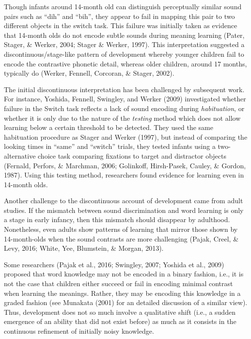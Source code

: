 \documentclass[english,,man,floatsintext]{apa6}
\theoremstyle{definition}
\theoremstyle{definition}
\theoremstyle{definition}
\theoremstyle{remark}
\begin{document}
Though infants around 14-month old can distinguish perceptually similar
sound pairs such as \enquote{dih} and \enquote{bih}, they appear to fail
in mapping this pair to two different objects in the switch task. This
failure was initially taken as evidence that 14-month olds do not encode
subtle sounds during meaning learning (Pater, Stager, \& Werker, 2004;
Stager \& Werker, 1997). This interpretation suggested a
discontinuous/stage-like pattern of development whereby younger children
fail to encode the contrastive phonetic detail, whereas older children,
around 17 months, typically do (Werker, Fennell, Corcoran, \& Stager,
2002).

The initial discontinuous interpretation has been challenged by
subsequent work. For instance, Yoshida, Fennell, Swingley, and Werker
(2009) investigated whether failure in the Switch task reflects a lack
of sound encoding during \emph{habituation}, or whether it is only due
to the nature of the \emph{testing} method which does not allow learning
below a certain threshold to be detected. They used the same habituation
procedure as Stager and Werker (1997), but instead of comparing the
looking times in \enquote{same} and \enquote{switch} trials, they tested
infants using a two-alternative choice task comparing fixations to
target and distractor objects (Fernald, Perfors, \& Marchman, 2006;
Golinkoff, Hirsh-Pasek, Cauley, \& Gordon, 1987). Using this testing
method, researchers found evidence for learning even in 14-month olds.

Another challenge to the discontinuous account of development came from
adult studies. If the mismatch between sound discrimination and word
learning is only a stage in early infancy, then this mismatch should
disappear by adulthood. Nonetheless, even adults show patterns of
learning that mirror those shown by 14-month-olds when the sound
contrasts are more challenging (Pajak, Creel, \& Levy, 2016; White, Yee,
Blumstein, \& Morgan, 2013).

Some researchers (Pajak et al., 2016; Swingley, 2007; Yoshida et al.,
2009) proposed that word knowledge may not be encoded in a binary
fashion, i.e., it is not the case that children either succeed or fail
in encoding minimal contrast when learning the meanings. Rather, they
may be encoding this knowledge in a graded fashion (see Munakata (2001)
for an detailed discussion of a similar view). Thus, development does
not so much involve a qualitative shift (i.e., a sudden emergence of an
ability that did not exist before) as much as it consists in the
continuous refinement of initially noisy knowledge.
\end{document}
